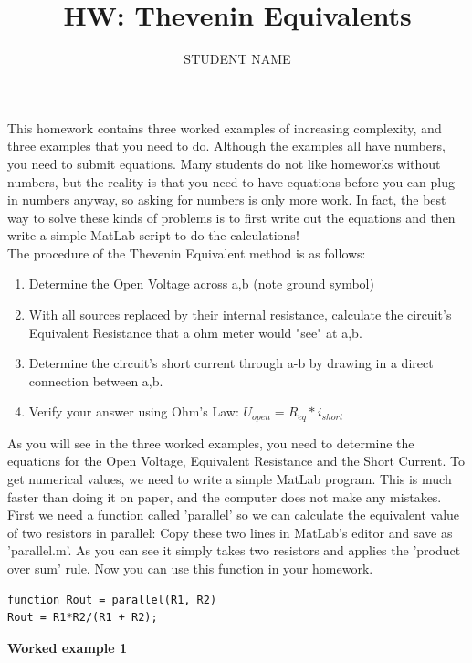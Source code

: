\documentclass[11pt,letterpaper]{article}
\author{STUDENT NAME}
\title{HW: Thevenin Equivalents}
\begin{document}
\maketitle

This homework contains three worked examples of increasing complexity, and three examples that you need to do. Although the examples all have numbers, you need to submit equations. Many students do not like homeworks without numbers, but the reality is that you need to have equations before you can plug in numbers anyway, so asking for numbers is only more work. In fact, the best way to solve these kinds of problems is to first write out the equations and then write a simple MatLab script to do the calculations!\\

The procedure of the Thevenin Equivalent method is as follows:

\begin{enumerate}
\item Determine the Open Voltage across a,b (note ground symbol)
\item With all sources replaced by their internal resistance, calculate the circuit's Equivalent Resistance that a ohm meter would "see" at a,b.
\item Determine the circuit's short current through a-b by drawing in a direct connection between a,b.
\item Verify your answer using Ohm's Law: $U_{open} = R_{eq} * i_{short}$
\end{enumerate}

As you will see in the three worked examples, you need to determine the equations for the Open Voltage, Equivalent Resistance and the Short Current. To get numerical values, we need to write a simple MatLab program. This is much faster than doing it on paper, and the computer does not make any mistakes. First we need a function called 'parallel' so we can calculate the equivalent value of two resistors in parallel: Copy these two lines in MatLab's editor and save as 'parallel.m'. As you can see it simply takes two resistors and applies the 'product over sum' rule. Now you can use this function in your homework.

\begin{lstlisting}
function Rout = parallel(R1, R2)
Rout = R1*R2/(R1 + R2);
\end{lstlisting}

\newpage

\textbf{Worked example 1}
\end{document}
